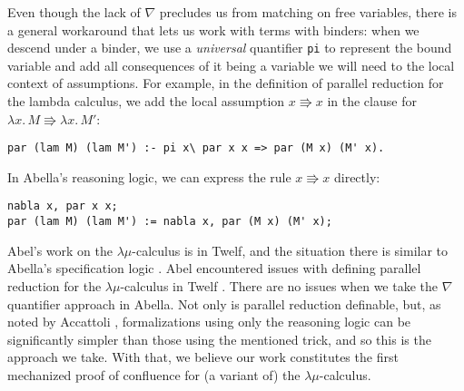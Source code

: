 \documentclass[a4paper, 11pt,titlepage, openright, twoside]{report}
\newcommand{\+}{\enspace}
\begin{document}
Even though the lack of $\nabla$ precludes us from matching on free variables,
there is a general workaround that lets us work with terms with binders:
when we descend under a binder,
we use a \textit{universal} quantifier \lstinline{pi} to represent the bound variable
and add all consequences of it being a variable we will need to the local context of assumptions.
For example, in the definition of parallel reduction for the lambda calculus,
we add the local assumption $x \Rrightarrow x$ in the clause for $λx.\,M \Rrightarrow λx.\,M'$:
\begin{lstlisting}
par (lam M) (lam M') :- pi x\ par x x => par (M x) (M' x).
\end{lstlisting}
In Abella's reasoning logic, we can express the rule $x \Rrightarrow x$ directly:
\begin{lstlisting}
nabla x, par x x;
par (lam M) (lam M') := nabla x, par (M x) (M' x);
\end{lstlisting}

Abel's work on the $λμ$-calculus is in Twelf, and the situation there
is similar to Abella's specification logic%
.
Abel encountered issues with defining parallel reduction for the $λμ$-calculus in Twelf \cite{3rd}.
There are no issues when we take the $\nabla$ quantifier approach in Abella.
Not only is parallel reduction definable,
but, as noted by Accattoli \cite{pearl},
formalizations using only the reasoning logic
can be significantly simpler than those using the mentioned trick,
and so this is the approach we take.
With that, we believe our work constitutes the first mechanized proof of confluence for (a variant of) the $λμ$-calculus.
\end{document}
